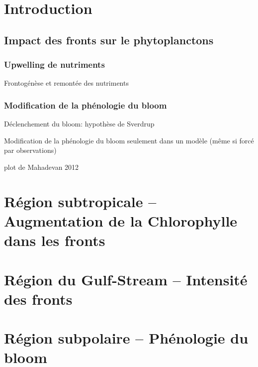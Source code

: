 \documentclass[11pt, french]{beamer}
\begin{document}
\section{Introduction}

\subsection{Impact des fronts sur le phytoplanctons}
\subsubsection{Upwelling de nutriments}

\begin{frame}{Frontogénèse et remontée des nutriments}
  \centering
\end{frame}

\subsubsection{Modification de la phénologie du bloom}

\begin{frame}{Déclenchement du bloom: hypothèse de Sverdrup}

\end{frame}

\begin{frame}{Modification de la phénologie du bloom}
  seulement dans un modèle (même si forcé par observations)

  plot de Mahadevan 2012
\end{frame}

\section{Région subtropicale -- Augmentation de la Chlorophylle dans les fronts}

\section{Région du Gulf-Stream -- Intensité des fronts}

\section{Région subpolaire -- Phénologie du bloom}
\end{document}
